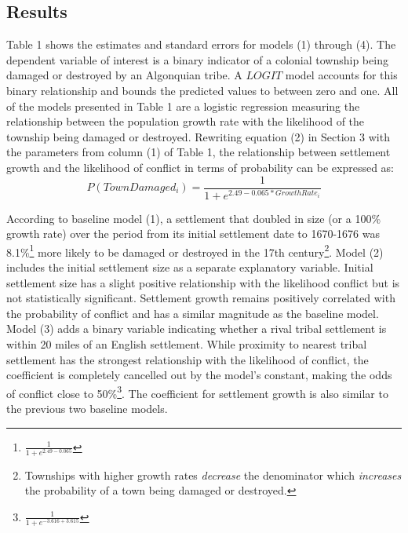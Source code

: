 \documentclass[sn-mathphys]{sn-jnl}%
\theoremstyle{thmstyleone}%
\theoremstyle{thmstyletwo}%
\theoremstyle{thmstylethree}%
\begin{document}
\subsection{Results}

Table 1 shows the estimates and standard errors for models (1) through (4). The dependent variable of interest is a binary indicator of a colonial township being damaged or destroyed by an Algonquian tribe. A $LOGIT$ model accounts for this binary relationship and bounds the predicted values to between zero and one. All of the models presented in Table 1 are a logistic regression measuring the relationship between the population growth rate with the likelihood of the township being damaged or destroyed. Rewriting equation (2) in Section 3 with the parameters from column (1) of Table 1, the relationship between settlement growth and the likelihood of conflict in terms of probability can be expressed as:
\begin{equation}
P(TownDamaged_{i})=\frac{1}{1+e^{2.49-0.065*GrowthRate_{i}}}
\end{equation}

According to baseline model (1), a settlement that doubled in size (or a 100\% growth rate) over the period from its initial settlement date to 1670-1676 was 8.1\%\footnote{$\frac{1}{1+e^{2.49-0.065}}$} more likely to be damaged or destroyed in the 17th century\footnote{Townships with higher growth rates \textit{decrease} the denominator which \textit{increases} the probability of a town being damaged or destroyed.}. %
Model (2) includes the initial settlement size as a separate explanatory variable. Initial settlement size has a slight positive relationship with the likelihood conflict but is not statistically significant. Settlement growth remains positively correlated with the probability of conflict and has a similar magnitude as the baseline model. Model (3) adds a binary variable indicating whether a rival tribal settlement is within 20 miles of an English settlement. While proximity to nearest tribal settlement has the strongest relationship with the likelihood of conflict, the coefficient is completely cancelled out by the model's constant, making the odds of conflict close to 50\%\footnote{$\frac{1}{1+e^{-3.616+3.615}}$}. The coefficient for settlement growth is also similar to the previous two baseline models. 
\end{document}
